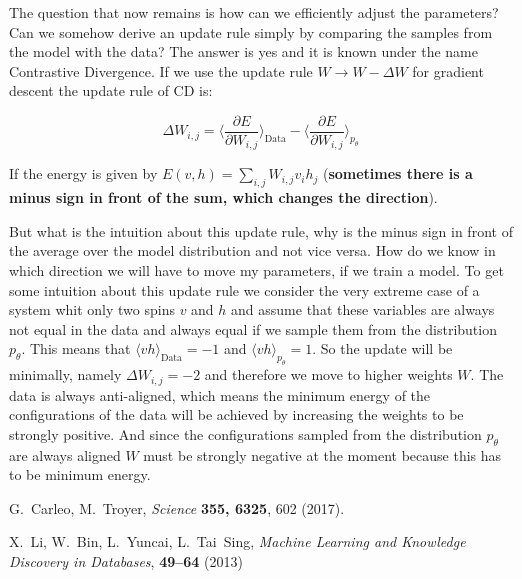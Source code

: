\documentclass[nofootinbib, superscriptaddress, prl]{revtex4}
\begin{document}
The question that now remains is how can we efficiently adjust the parameters? Can we somehow derive an update rule simply by comparing the samples from the model with the data? The answer is yes and it is known under the name Contrastive Divergence. If we use the update rule $W \rightarrow W - \Delta W$ for gradient descent the update rule of CD is:

\begin{equation*}
	\Delta W_{i,j} = \langle \frac{ \partial E}{\partial W_{i,j}} \rangle_{\text{Data}} - \langle \frac{\partial E}{\partial W_{i,j}} \rangle_{p_{\theta}} %
\end{equation*}

If the energy is given by $E(v,h) = \sum_{i,j} W_{i,j} v_i h_j $ (\textbf{sometimes there is a minus sign in front of the sum, which changes the direction}).

But what is the intuition about this update rule, why is the minus sign in front of the average over the model distribution and not vice versa. How do we know in which direction we will have to move my parameters, if we train a model.
To get some intuition about this update rule we consider the very extreme case of a system whit only two spins $v$ and $h$ and assume that these variables are always not equal in the data and always equal if we sample them from the distribution $p_{\theta}$. This means that $\langle v h \rangle_{\text{Data}} = -1$
 and $\langle v h \rangle_{p_{\theta}}  = 1$. So the update will be minimally, namely $\Delta W_{i,j} = -2$ and therefore we move to higher weights $W$. The data is always anti-aligned, which means the minimum energy of the configurations of the data will be achieved by increasing the weights to be strongly positive. And since the configurations sampled from the distribution $p_{\theta}$ are always aligned $W$ must be strongly negative at the moment because this has to be minimum energy.
 
\begin{thebibliography}{10}

G.~Carleo, M.~Troyer, {\it Science\/} {\bf 355, 6325}, 602
  (2017).

X.~Li, W.~Bin, L.~Yuncai, L.~Tai~Sing, {\it Machine Learning and Knowledge Discovery in Databases}, {\bf 49--64} (2013)

\end{thebibliography} 
\end{document}
